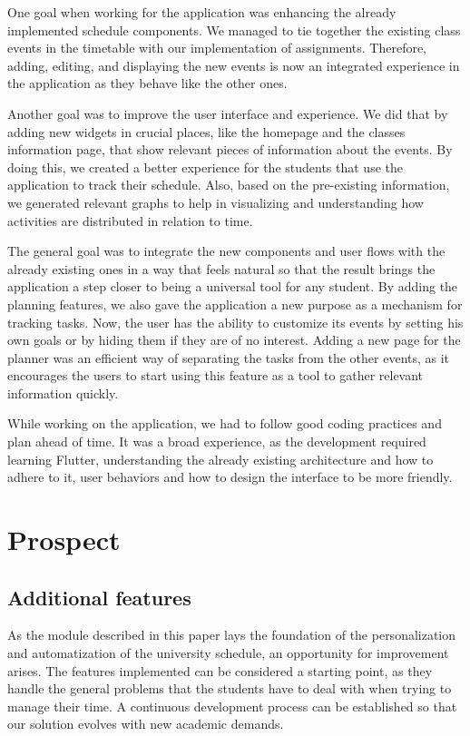 One goal when working for the application was enhancing the already implemented schedule components. We managed to tie together the existing class events in the timetable with our implementation of assignments. Therefore, adding, editing, and displaying the new events is now an integrated experience in the application as they behave like the other ones. 

Another goal was to improve the user interface and experience. We did that by adding new widgets in crucial places, like the homepage and the classes information page, that show relevant pieces of information about the events. By doing this, we created a better experience for the students that use the application to track their schedule. Also, based on the pre-existing information, we generated relevant graphs to help in visualizing and understanding how activities are distributed in relation to time.

The general goal was to integrate the new components and user flows with the already existing ones in a way that feels natural so that the result brings the application a step closer to being a universal tool for any student. By adding the planning features, we also gave the application a new purpose as a mechanism for tracking tasks. Now, the user has the ability to customize its events by setting his own goals or by hiding them if they are of no interest. Adding a new page for the planner was an efficient way of separating the tasks from the other events, as it encourages the users to start using this feature as a tool to gather relevant information quickly. 

While working on the application, we had to follow good coding practices and plan ahead of time. It was a broad experience, as the development required learning Flutter, understanding the already existing architecture and how to adhere to it, user behaviors and how to design the interface to be more friendly. 

\section{Prospect} \label{7:prospect}

\subsection{Additional features} \label{7:follow}

As the module described in this paper lays the foundation of the personalization and automatization of the university schedule, an opportunity for improvement arises. The features implemented can be considered a starting point, as they handle the general problems that the students have to deal with when trying to manage their time. A continuous development process can be established so that our solution evolves with new academic demands.

